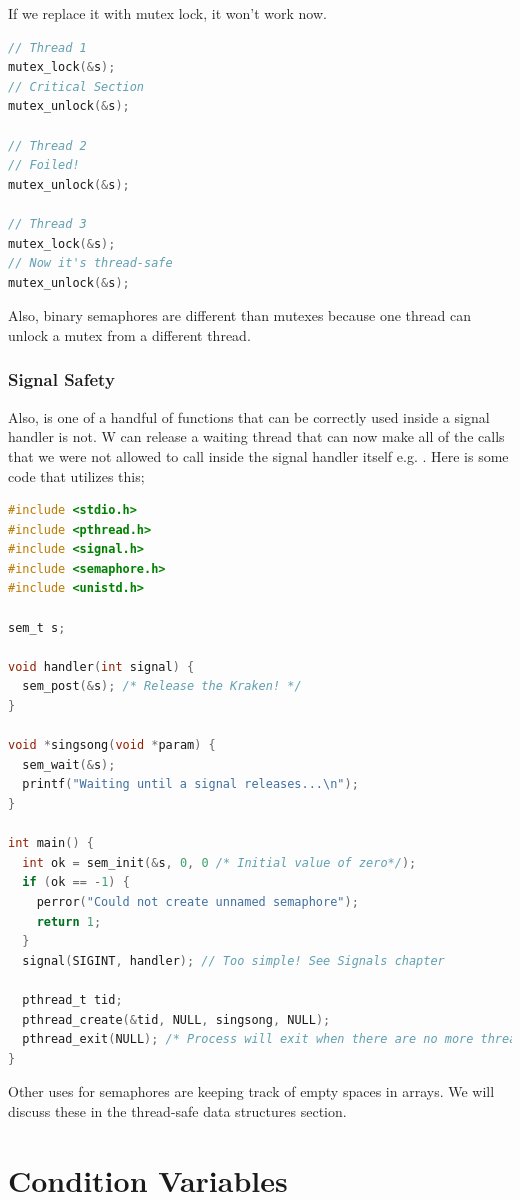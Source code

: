 If we replace it with mutex lock, it won't work now.

\begin{lstlisting}[language=C]
// Thread 1
mutex_lock(&s);
// Critical Section
mutex_unlock(&s);

// Thread 2
// Foiled!
mutex_unlock(&s);

// Thread 3
mutex_lock(&s);
// Now it's thread-safe
mutex_unlock(&s);
\end{lstlisting}

Also, binary semaphores are different than mutexes because one thread can unlock a mutex from a different thread.

\subsubsection{Signal Safety}

Also,  is one of a handful of functions that can be correctly used inside a signal handler  is not.
W can release a waiting thread that can now make all of the calls that we were not allowed to call inside the signal handler itself e.g. .
Here is some code that utilizes this;

\begin{lstlisting}[language=C]
#include <stdio.h>
#include <pthread.h>
#include <signal.h>
#include <semaphore.h>
#include <unistd.h>

sem_t s;

void handler(int signal) {
  sem_post(&s); /* Release the Kraken! */
}

void *singsong(void *param) {
  sem_wait(&s);
  printf("Waiting until a signal releases...\n");
}

int main() {
  int ok = sem_init(&s, 0, 0 /* Initial value of zero*/);
  if (ok == -1) {
    perror("Could not create unnamed semaphore");
    return 1;
  }
  signal(SIGINT, handler); // Too simple! See Signals chapter

  pthread_t tid;
  pthread_create(&tid, NULL, singsong, NULL);
  pthread_exit(NULL); /* Process will exit when there are no more threads */
}
\end{lstlisting}

Other uses for semaphores are keeping track of empty spaces in arrays.
We will discuss these in the thread-safe data structures section.

\section{Condition Variables}

